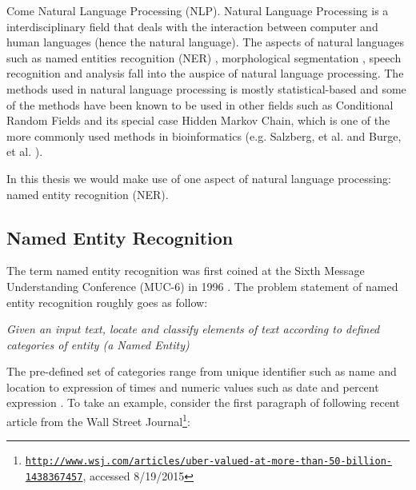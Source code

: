 Come Natural Language Processing (NLP). Natural Language Processing is a interdisciplinary field that deals with the interaction between computer and human languages (hence the natural language). The aspects of natural languages such as named entities recognition (NER) \citep{nadeau2007survey}, morphological segmentation \citep{meyer1990morphological}, speech recognition and analysis  \citep{rabiner1993fundamentals} fall into the auspice of natural language processing. The methods used in natural language processing is mostly statistical-based \citep{manning1999foundations} and some of the methods have been known to be used in other fields such as Conditional Random Fields \citep{sutton2006introduction} and its special case Hidden Markov Chain, which is one of the more commonly used methods in bioinformatics (e.g. Salzberg, et al. \citep{salzberg1998microbial} and Burge, et al. \citep{burge1998modeling}).

In this thesis we would make use of one aspect of natural language processing: named entity recognition (NER).




\subsection{Named Entity Recognition}

\label{ssec:NERC2}

The term named entity recognition was first coined at the Sixth Message Understanding Conference (MUC-6) in 1996 \citep{nadeau2007survey} \citep{grishman1996message}. The problem statement of named entity recognition roughly goes as follow:

\begin{center}
\textit{Given an input text, locate and classify elements of text according to defined categories of entity (a Named Entity)}
\end{center}

The pre-defined set of categories range from unique identifier such as name and location to expression of times and numeric values such as date and percent expression \citep{nadeau2007survey}. To take an example, consider the first paragraph of following recent article from the Wall Street Journal\footnote{\texttt{\href{http://www.wsj.com/articles/uber-valued-at-more-than-50-billion-1438367457}{http://www.wsj.com/articles/uber-valued-at-more-than-50-billion-1438367457}}, accessed 8/19/2015}:


